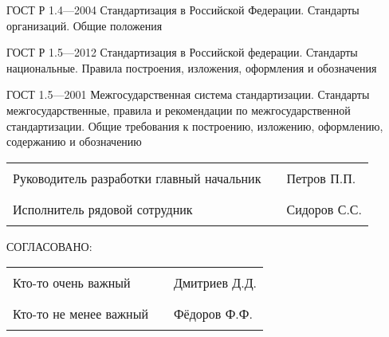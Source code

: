 \documentclass[12pt, twoside, final]{ruost}
\begin{document}
\begin{OST}
		\newpage		
		\begin{thebibliography}{9}
			\item ГОСТ Р 1.4---2004 Стандартизация в Российской Федерации. Стандарты организаций. Общие положения
			\item ГОСТ Р 1.5---2012 Стандартизация в Российской федерации. Стандарты национальные. Правила построения, изложения, оформления и обозначения
			\item ГОСТ 1.5---2001 Межгосударственная система стандартизации. Стандарты межгосударственные, правила и рекомендации по межгосударственной стандартизации. Общие требования к построению, изложению, оформлению, содержанию и обозначению
		\end{thebibliography}
	
	\end{OST}
	
	\noindent
	\begin{tabu}{@{}X[10,l]X[2,c]X[3,l]@{}}
		Руководитель разработки главный начальник  & \rule{\linewidth}{1pt} & Петров П.П.  \\
		Исполнитель рядовой сотрудник              & \rule{\linewidth}{1pt} & Сидоров С.С. \\
	\end{tabu}\vspace{1cm}
	
	\noindent СОГЛАСОВАНО:\vspace{.5cm}
	
	\noindent
	\begin{tabu}{@{}X[10,l]X[2,c]X[3,l]@{}}
		Кто-то очень важный    & \rule{\linewidth}{1pt} & Дмитриев Д.Д. \\
		Кто-то не менее важный & \rule{\linewidth}{1pt} & Фёдоров Ф.Ф.  \\
	\end{tabu}
	
\end{document}
